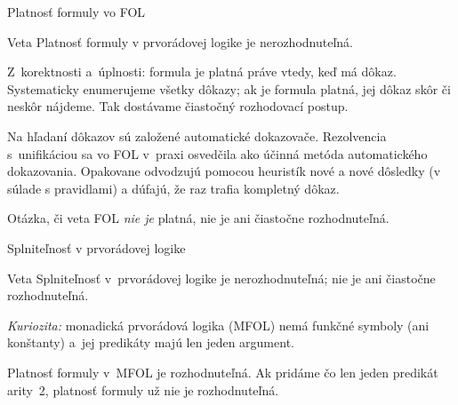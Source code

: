 \documentclass[12pt]{beamer}
\begin{document}
\begin{frame}{Platnosť formuly vo FOL}
\begin{block}{Veta}
  Platnosť formuly v prvorádovej logike je nerozhodnuteľná.
\end{block}

Z~korektnosti a~úplnosti: formula je platná práve vtedy, keď má dôkaz.
Systematicky enumerujeme všetky dôkazy; ak je formula platná,
jej dôkaz skôr či neskôr nájdeme.
Tak dostávame \alert{čiastočný rozhodovací postup}.

\medskip
Na hľadaní dôkazov sú založené automatické dokazovače.
Rezolvencia s~unifikáciou sa vo FOL v~praxi osvedčila ako účinná metóda automatického dokazovania.
Opakovane odvodzujú pomocou heuristík nové a nové dôsledky (v súlade s pravidlami) a dúfajú, že raz trafia kompletný dôkaz.

\medskip
Otázka, či veta FOL \emph{nie je} platná, nie je ani čiastočne rozhodnuteľná.
\end{frame}

\begin{frame}{Splniteľnosť v prvorádovej logike}
  \begin{block}{Veta}
    Splniteľnosť v~prvorádovej logike je nerozhodnuteľná;
    nie je ani čiastočne rozhodnuteľná.
  \end{block}

  \medskip
  \emph{Kuriozita:} monadická prvorádová logika (MFOL) nemá funkčné symboly
  (ani konštanty) a~jej predikáty majú len jeden argument.

  Platnosť formuly v~MFOL je rozhodnuteľná.
  Ak pridáme čo len jeden predikát arity~2, platnosť formuly už
  nie je rozhodnuteľná.
\end{frame}
\end{document}
